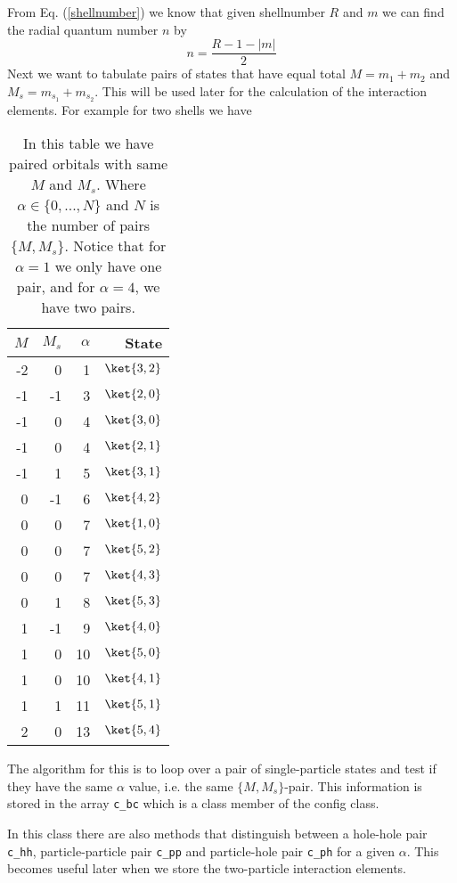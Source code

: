 %
From Eq. (\ref{shellnumber}) we know that given shellnumber $R$ and $m$ we can find the radial quantum number $n$ by
%
\begin{equation}
n = \frac{R - 1 - |m|}{2}
\label{radialquantum number}  
\end{equation}
%
Next we want to tabulate pairs of states that have equal total $M = m_1 + m_2$ and $M_s = m_{s_1} + m_{s_2}$. This will be used later for the calculation of the  interaction elements. For example for two shells we have 
 
\begin{table}[H]
\centering 
\begin{tabular}{rrrr}
\toprule
$M$ & $M_s$ & $\alpha$ & State\\
\midrule
 -2 &  0 &  1  &$\ket{3,2}$ \\
 -1 & -1  & 3  &$\ket{2,0}$ \\
 -1 &  0 &  4  &$\ket{3,0}$ \\
 -1 &  0  & 4  &$\ket{2,1}$ \\
 -1 &  1 &  5  &$\ket{3,1}$ \\
  0 & -1 &  6  &$\ket{4,2}$ \\
  0 &  0 &  7  &$\ket{1,0}$ \\
  0 &  0 & 7   &$\ket{5,2}$ \\
  0 &  0 & 7   &$\ket{4,3}$\\
  0 &  1 &  8  &$\ket{5,3}$\\
  1 & -1 &  9  &$\ket{4,0}$ \\
  1 &  0 & 10  &$\ket{5,0}$\\
  1 &  0 & 10  &$\ket{4,1}$\\
  1 &  1 &  11 &$\ket{5,1}$ \\
  2 &  0 & 13  &$\ket{5,4}$ \\
\bottomrule
\end{tabular}
\caption{In this table we have paired orbitals with same $M$ and $M_s$. Where $\alpha \in \{0,...,N\}$ and $N$ is the number of pairs $\{M,M_s\}$. Notice that for $\alpha = 1$ we only have one pair, and for $\alpha = 4$, we have two pairs.}
\label{tab:configpair}
\end{table}
%
The algorithm for this is to loop over a pair of single-particle states and test if they have the same $\alpha$ value, i.e. the same $\{M,M_s\}$-pair. This information is stored in the array \texttt{c\_bc} which is a class member of the config class. 

In this class there are also methods that distinguish between a hole-hole pair \texttt{c\_hh}, particle-particle pair \texttt{c\_pp} and particle-hole pair \texttt{c\_ph} for a given $\alpha$. This becomes useful later when we store the two-particle interaction elements.
 
